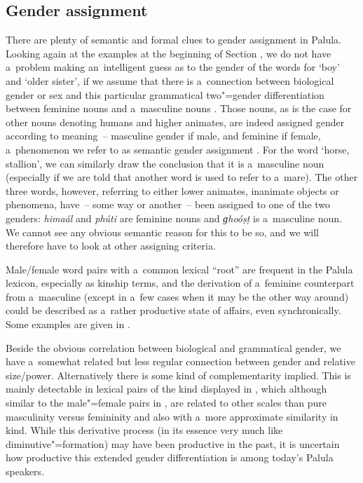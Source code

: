 \subsection{Gender assignment}
\label{subsec:4-3-1}


There are plenty of semantic and formal clues to gender assignment in Palula. Looking again at the examples at the beginning of Section , we do not have a~problem making an~intelligent guess as to the gender of the words for `boy' and `older sister', if we assume that there is a~connection between biological gender or sex and this particular grammatical two"=gender differentiation between feminine nouns and a~masculine nouns \citep[102]{dahl2000}. Those nouns, as is the case for other nouns denoting humans and higher animates, are indeed assigned gender according to meaning~-- masculine gender if male, and feminine if female, a~phenomenon we refer to as semantic gender assignment \citep[7--32]{corbett1991}. For the word `horse, stallion', we can similarly draw the conclusion that it is a~masculine noun (especially if we are told that another word is used to refer to a~mare). The other three words, however, referring to either lower animates, inanimate objects or phenomena, have~-- some way or another~-- been assigned to one of the two genders: \textit{himaál} and \textit{phúti} are feminine nouns and \textit{ɡhoóṣṭ} is a~masculine noun. We cannot see any obvious semantic reason for this to be so, and we will therefore have to look at other assigning criteria.


Male/female word pairs with a~common lexical ``root'' are frequent in the Palula lexicon, especially as kinship terms, and the derivation of a~feminine counterpart from a~masculine (except in a~few cases when it may be the other way around) could be described as a~rather productive state of affairs, even synchronically. Some examples are given in .


Beside the obvious correlation between biological and grammatical gender, we have a~somewhat related but less regular connection between gender and relative size/power. Alternatively there is some kind of complementarity implied. This is mainly detectable in lexical pairs of the kind displayed in , which although similar to the male"=female pairs in , are related to other scales than pure masculinity versus femininity and also with a~more approximate similarity in kind. While this derivative process (in its essence very much like diminutive"=formation) may have been productive in the past, it is uncertain how productive this extended gender differentiation is among today's Palula speakers.



